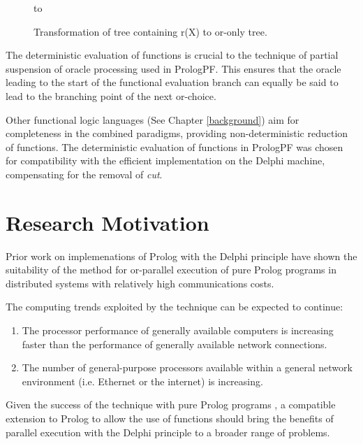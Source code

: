 \begin{figure}[h]
\vspace{5mm} \hbox to 
\caption{Transformation of tree containing r(X) to or-only tree.}
\vspace{5mm}
\label{fun_tree4}
\end{figure}

The deterministic evaluation of functions is crucial to the 
technique of partial suspension of
oracle processing used in PrologPF.  This ensures that the oracle leading to the 
start of the functional evaluation branch can equally be said to lead to the 
branching point of the next or-choice.

Other functional logic languages (See Chapter \ref{background}) aim for
completeness in the combined paradigms, providing non-deterministic
reduction of functions.  The deterministic evaluation of functions in PrologPF
was chosen for compatibility with the efficient implementation on the
Delphi machine, compensating for the removal of \textit{cut}.

\section{Research Motivation} %

Prior work on implemenations of Prolog with the Delphi principle
\cite{Kle91, Sar95} have shown the suitability of the method for
or-parallel execution of pure Prolog programs in distributed systems
with relatively high communications costs.

The computing trends exploited by the technique can be expected to
continue:
\begin{enumerate}
\item{The processor performance of generally available computers
  is increasing faster than the performance of generally available
  network connections.}
\item{The number of general-purpose processors available within
  a general network environment (i.e. Ethernet or the internet)
  is increasing.}
\end{enumerate}

Given the success of the technique with pure Prolog programs
\cite{Sar95}, a compatible extension to Prolog to allow the use
of functions should bring the benefits of parallel execution
with the Delphi principle to
a broader range of problems.

